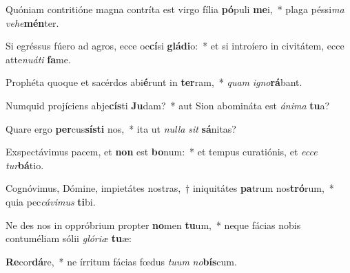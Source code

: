 \item Quóniam contritióne magna contríta est virgo fília \textbf{pó}puli \textbf{me}i,~* plaga péssi\textit{ma} \textit{ve}\textit{he}\textbf{mén}ter.
\item Si egréssus fúero ad agros, ecce oc\textbf{cí}si \textbf{glá}\textbf{di}o:~* et si introíero in civitátem, ecce atte\textit{nu}\textit{á}\textit{ti} \textbf{fa}me.
\item Prophéta quoque et sacérdos abi\textbf{é}runt in \textbf{ter}ram,~* \textit{quam} \textit{i}\textit{gno}\textbf{rá}bant.
\item Numquid projíciens abje\textbf{cís}ti \textbf{Ju}dam?~* aut Sion abomináta est \textit{á}\textit{ni}\textit{ma} \textbf{tu}a?
\item Quare ergo \textbf{per}cus\textbf{sís}\textbf{ti} nos,~* ita ut \textit{nul}\textit{la} \textit{sit} \textbf{sá}nitas?
\item Exspectávimus pacem, et \textbf{non} est \textbf{bo}num:~* et tempus curatiónis, et \textit{ec}\textit{ce} \textit{tur}\textbf{bá}tio.
\item Cognóvimus, Dómine, impietátes nostras,~† iniquitátes \textbf{pa}trum nos\textbf{tró}rum,~* quia pec\textit{cá}\textit{vi}\textit{mus} \textbf{ti}bi.
\item Ne des nos in oppróbrium propter \textbf{no}men \textbf{tu}um,~* neque fácias nobis contuméliam sólii \textit{gló}\textit{ri}\textit{æ} \textbf{tu}æ:
\item \textbf{Re}cor\textbf{dá}re,~* ne írritum fácias fœdus \textit{tu}\textit{um} \textit{no}\textbf{bís}cum.

